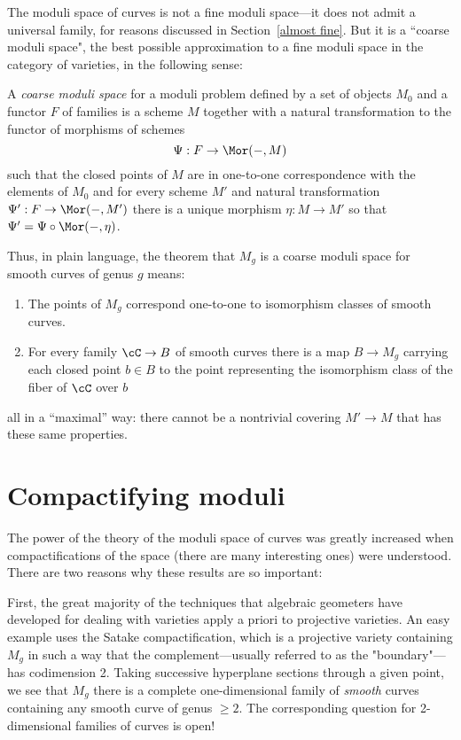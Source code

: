 The moduli space of curves is not a fine moduli space---it does not admit a universal family, for reasons discussed in Section~\ref{almost fine}. But it is a ``coarse moduli space", the best possible approximation to a fine moduli space in the category of varieties, in the following sense:

\begin{definition}
A \emph{coarse moduli space} for a moduli problem defined by a set of objects $M_0$ and a functor $F$ of families is a scheme $M$ together with 
a natural transformation to the functor of morphisms of schemes
$$
\Psi: F\to \Mor(-, M)
$$
such that the closed points of $M$ are in one-to-one correspondence with the elements of $M_0$ and
for every scheme $M'$ and natural transformation $\Psi': F \to \Mor(-, M')$
there is a unique morphism $\eta: M\to M'$ so that $\Psi' = \Psi\circ \Mor(-, \eta)$.
\end{definition}

Thus, in plain language, the theorem that $M_g$ is a coarse moduli space for smooth curves of genus $g$ means: 
\begin{enumerate}
 \item The points of $M_g$ correspond one-to-one to isomorphism classes of smooth curves.
 \item For every family $\cC \to B$ of smooth curves there is a map $B\to M_g$ carrying
 each closed point  $b \in B$ to the point representing the isomorphism class of the fiber of $\cC$ over $b$
\end{enumerate}
all in a ``maximal'' way: there cannot be a nontrivial covering $M' \to M$ that has these same properties.

\section{Compactifying moduli}

The power of the theory of the moduli space of curves was greatly increased when compactifications of the space (there are many interesting ones) were understood. There are two reasons why these results are so important:

First, the great majority of the techniques that algebraic geometers have developed for dealing with varieties apply a priori to projective varieties. An easy example uses the Satake compactification, which is a projective variety containing $M_g$ in such a way that the complement---usually referred to as the "boundary"---has codimension 2. Taking successive hyperplane sections through a given point, we see that $M_g$ there is a complete one-dimensional family of \emph{smooth} curves containing any smooth curve of genus $\geq 2$. The corresponding question for 2-dimensional families of curves is open!

